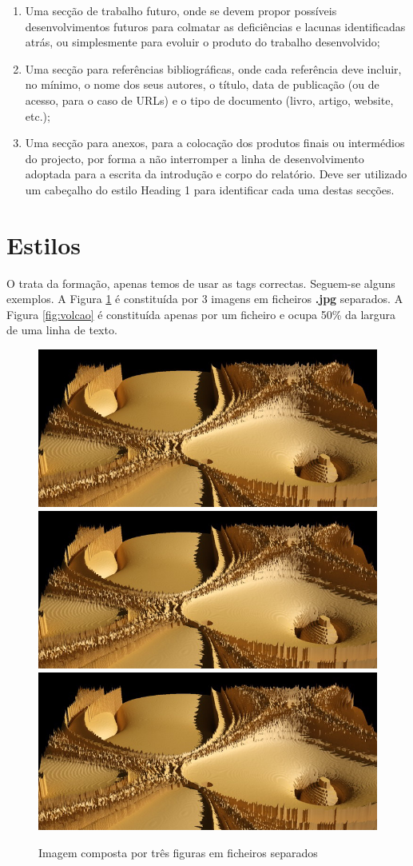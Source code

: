\begin{enumerate}
 \item Uma secção de trabalho futuro, onde se devem propor possíveis desenvolvimentos futuros para colmatar as deficiências e lacunas identificadas atrás, ou simplesmente para evoluir o produto do trabalho desenvolvido;
 \item Uma secção para referências bibliográficas, onde cada referência deve incluir, no mínimo, o nome dos seus autores, o título, data de publicação (ou de acesso, para o caso de URLs) e o tipo de documento (livro, artigo, website, etc.);
 \item Uma secção para anexos, para a colocação dos produtos finais ou intermédios do projecto, por forma a não interromper a linha de desenvolvimento adoptada para a escrita da introdução e corpo do relatório.
Deve ser utilizado um cabeçalho do estilo Heading 1 para identificar cada uma destas secções.
\end{enumerate}



\section{Estilos}

O \LaTeXe trata da formação, apenas temos de usar as tags correctas. Seguem-se alguns exemplos. A Figura \ref{fig:terrenos} é constituída por 3 imagens em ficheiros \textbf{.jpg} separados. A Figura \ref{fig:volcao} é constituída apenas por um ficheiro e ocupa 50\% da largura de uma linha de texto.


\begin{figure}
 \centering
 \includegraphics[width=0.32\linewidth]{imgs/tp04a_450}
 \includegraphics[width=0.32\linewidth]{imgs/tp04a_450}
 \includegraphics[width=0.32\linewidth]{imgs/tp04a_450}
 \caption[curta]{Imagem composta por três figuras em ficheiros separados}
 \label{fig:terrenos}
\end{figure}


